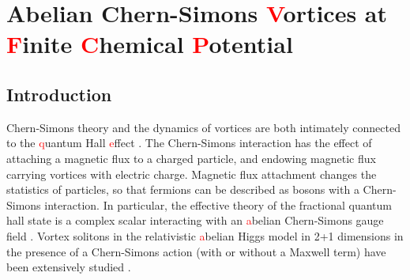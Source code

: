 \chapter{Abelian Chern-Simons \textcolor{red}{V}ortices at \textcolor{red}{F}inite \textcolor{red}{C}hemical \textcolor{red}{P}otential}
\label{ch:Chapter_2}
    \graphicspath{{Chapter_2_Folder/figures/PNG/}{Chapter_2_Folder/figures/PDF/}{Chapter_2_Folder/figures/}}


\section{Introduction}
Chern-Simons theory and the dynamics of vortices are both intimately connected to the \textcolor{red}{q}uantum Hall \textcolor{red}{e}ffect \cite{PhysRevLett.62.82}. The Chern-Simons interaction  has the effect of attaching a magnetic flux to a charged particle, and endowing magnetic flux carrying vortices  with electric charge.  Magnetic flux attachment changes the  statistics of particles, so that fermions can be described as bosons with a Chern-Simons interaction. In particular, the effective theory of the fractional quantum hall state is a complex scalar interacting with an \textcolor{red}{a}belian Chern-Simons gauge field \cite{PhysRevLett.62.82, Tong:2016kpv}.
Vortex solitons in the relativistic \textcolor{red}{a}belian Higgs model  in 2+1 dimensions in the presence  of a Chern-Simons action  (with or without a Maxwell term) have been extensively studied \cite{Paul:1986ix, Jackiw:1990aw, Hong:1990yh, Jackiw:1990pr, Dunne:1998qy, Horvathy:2008hd}.

